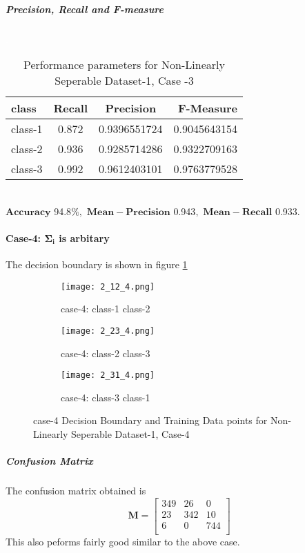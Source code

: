 \documentclass[a4paper]{article}
\begin{document}
\subparagraph{Precision, Recall and F-measure} \textcolor{white}{:}
\begin{table}[h!]
  \begin{center}
    \caption{Performance parameters for Non-Linearly Seperable Dataset-1, Case -3}
    \label{tab:table1}
    \begin{tabular}{l|c|c|r} %
      \textbf{class} & \textbf{Recall} & \textbf{Precision} & \textbf{F-Measure}\\
      \hline
      class-1 & 0.872 & 0.9396551724 & 0.9045643154\\
      class-2 & 0.936 & 0.9285714286 & 0.9322709163\\
      class-3 & 0.992 & 0.9612403101 & 0.9763779528\\
    \end{tabular}
  \end{center}
\end{table}
\\$\mathbf{Accuracy}$ 94.8$\%,$ $\mathbf{Mean- Precision}$ 0.943$,$ $\mathbf{Mean- Recall}$ 0.933$.$
\newpage
\paragraph{Case-4: $\mathbf{\Sigma_{i}}$ is arbitary}
The decision boundary is shown in figure \ref{fig:2_4}
\begin{figure}[h!]
  \centering
  \begin{subfigure}[b]{0.4\linewidth}
    \texttt{[image: 2\_12\_4.png]}
     \caption{case-4: class-1 class-2}
  \end{subfigure}
  \begin{subfigure}[b]{0.4\linewidth}
    \texttt{[image: 2\_23\_4.png]}
    \caption{case-4: class-2 class-3}
  \end{subfigure}
  \begin{subfigure}[b]{0.4\linewidth}
    \texttt{[image: 2\_31\_4.png]}
    \caption{case-4: class-3 class-1}
  \end{subfigure}
  \caption{case-4 Decision Boundary and Training Data points for Non-Linearly Seperable Dataset-1, Case-4}
  \label{fig:2_4}
\end{figure}
\subparagraph{Confusion Matrix}
The confusion matrix obtained is
\[
\mathbf{M} = \left[ {\begin{array}{ccc}
349 & 26 & 0\\
23 & 342 & 10\\
6 & 0 & 744\\
\end{array}} \right]
\]This also peforms fairly good similar to the above case.\\
\end{document}
